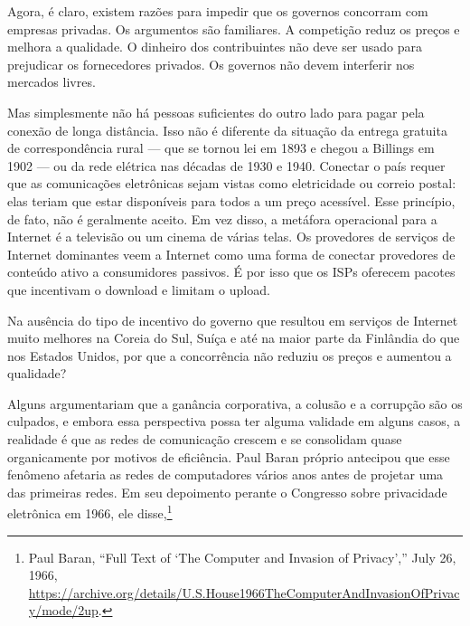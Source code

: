Agora, é claro, existem razões para impedir que os governos concorram com empresas privadas.
Os argumentos são familiares. A competição reduz os preços e melhora a qualidade. O dinheiro
dos contribuintes não deve ser usado para prejudicar os fornecedores privados. Os governos
não devem interferir nos mercados livres.

Mas simplesmente não há pessoas suficientes do outro lado para pagar pela conexão de longa
distância. Isso não é diferente da situação da entrega gratuita de correspondência rural
--- que se tornou lei em 1893 e chegou a Billings em 1902 --- ou da rede elétrica nas décadas
de 1930 e 1940. Conectar o país requer que as comunicações eletrônicas sejam vistas como
eletricidade ou correio postal: elas teriam que estar disponíveis para todos a um preço
acessível. Esse princípio, de fato, não é geralmente aceito. Em vez disso, a metáfora
operacional para a Internet é a televisão ou um cinema de várias telas. Os provedores de
serviços de Internet dominantes veem a Internet como uma forma de conectar provedores de
conteúdo ativo a consumidores passivos. É por isso que os ISPs oferecem pacotes que incentivam
o download e limitam o upload.

Na ausência do tipo de incentivo do governo que resultou em serviços de Internet muito
melhores na Coreia do Sul, Suíça e até na maior parte da Finlândia do que nos Estados Unidos,
por que a concorrência não reduziu os preços e aumentou a qualidade?

Alguns argumentariam que a ganância corporativa, a colusão e a corrupção são os culpados, e
embora essa perspectiva possa ter alguma validade em alguns casos, a realidade é que as redes
de comunicação crescem e se consolidam quase organicamente por motivos de eficiência. Paul
Baran próprio antecipou que esse fenômeno afetaria as redes de computadores vários anos antes
de projetar uma das primeiras redes. Em seu depoimento perante o Congresso sobre privacidade
eletrônica em 1966, ele disse,\footnote{Paul Baran, ``Full Text of `The Computer and Invasion
of Privacy','' July 26, 1966,
\url{https://archive.org/details/U.S.House1966TheComputerAndInvasionOfPrivacy/mode/2up}.}

